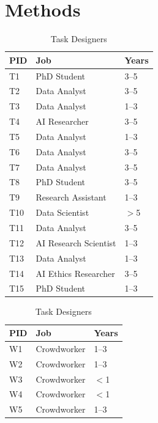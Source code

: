 \section{Methods}


\begin{table}
\fontsize{7pt}{10pt}\selectfont
\centering
\begin{minipage}[b]{0.32\textwidth} %
\centering
\begin{tabular}{lll}
\toprule
\textbf{PID} & \textbf{Job} & \textbf{Years} \\
\midrule
T1 & PhD Student & 3--5 \\
T2 & Data Analyst & 3--5 \\
T3 & Data Analyst & 1--3 \\
T4 & AI Researcher & 3--5 \\
T5 & Data Analyst & 1--3 \\
T6 & Data Analyst & 3--5 \\
T7 & Data Analyst & 3--5 \\
T8 & PhD Student & 3--5 \\
T9 & Research Assistant & 1--3 \\
T10 & Data Scientist & $>$5 \\
T11 & Data Analyst & 3--5 \\
T12 & AI Research Scientist & 1--3 \\
T13 & Data Analyst & 1--3 \\
T14 & AI Ethics Researcher & 3--5 \\
T15 & PhD Student & 1--3 \\
\bottomrule
\end{tabular}
\caption{Task Designers}
\label{tab:task-designer}
\end{minipage}
\hfill
\begin{minipage}[b]{0.32\textwidth}
\fontsize{7pt}{10pt}\selectfont
\centering
\begin{tabular}{lll}
\toprule
\textbf{PID} & \textbf{Job} & \textbf{Years} \\
\midrule
W1 & Crowdworker & 1--3 \\
W2 & Crowdworker & 1--3 \\
W3 & Crowdworker & $<$1 \\
W4 & Crowdworker & $<$1 \\
W5 & Crowdworker & 1--3 \\

\end{tabular}
\end{minipage}
\end{table}
